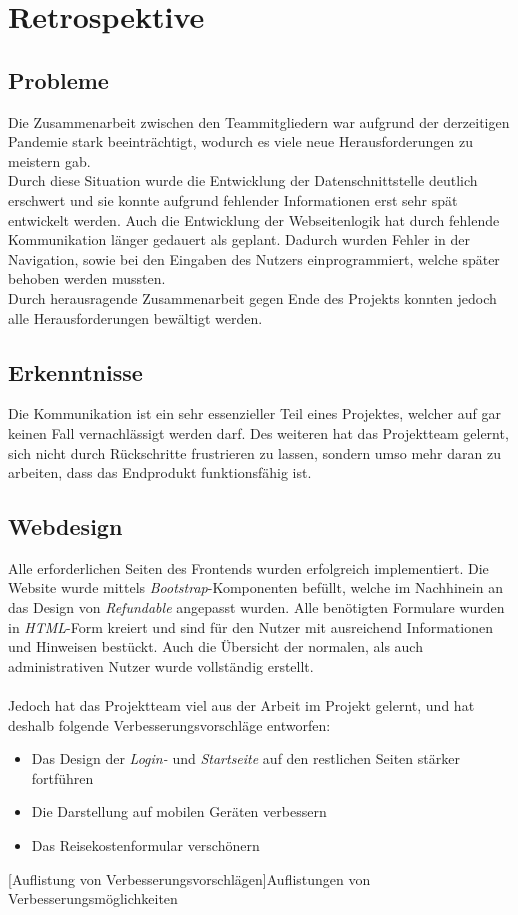 \chapter{Retrospektive}
\section{Probleme}
Die Zusammenarbeit zwischen den Teammitgliedern war aufgrund der derzeitigen Pandemie stark beeinträchtigt, wodurch es viele neue Herausforderungen zu meistern gab.\\

Durch diese Situation wurde die Entwicklung der Datenschnittstelle deutlich erschwert und sie konnte aufgrund fehlender Informationen erst sehr spät entwickelt werden. Auch die Entwicklung der Webseitenlogik hat durch fehlende Kommunikation länger gedauert als geplant. Dadurch wurden Fehler in der Navigation, sowie bei den Eingaben des Nutzers einprogrammiert, welche später behoben werden mussten.\\

Durch herausragende Zusammenarbeit gegen Ende des Projekts konnten jedoch alle Herausforderungen bewältigt werden.
\section{Erkenntnisse}
Die Kommunikation ist ein sehr essenzieller Teil eines Projektes, welcher auf gar keinen Fall vernachlässigt werden darf. Des weiteren hat das Projektteam gelernt, sich nicht durch Rückschritte frustrieren zu lassen, sondern umso mehr daran zu arbeiten, dass das Endprodukt funktionsfähig ist.
\newpage
\section{Webdesign}
Alle erforderlichen Seiten des Frontends wurden erfolgreich implementiert. Die Website wurde mittels \textit{Bootstrap}-Komponenten befüllt, welche im Nachhinein an das Design von \textit{Refundable} angepasst wurden. Alle benötigten Formulare wurden in \textit{HTML}-Form kreiert und sind für den Nutzer mit ausreichend Informationen und Hinweisen bestückt. Auch die Übersicht der normalen, als auch administrativen Nutzer wurde vollständig erstellt.\\
~\\
Jedoch hat das Projektteam viel aus der Arbeit im Projekt gelernt, und hat deshalb folgende Verbesserungsvorschläge entworfen:
\begin{itemize}
	\item Das Design der \textit{Login-} und \textit{Startseite} auf den restlichen Seiten stärker fortführen
	\item Die Darstellung auf mobilen Geräten verbessern
	\item Das Reisekostenformular verschönern
\end{itemize}
[Auflistung von Verbesserungsvorschlägen]{Auflistungen von Verbesserungsmöglichkeiten}

